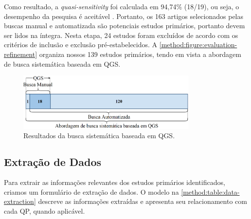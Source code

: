 Como resultado, a \textit{quasi-sensitivity} foi calculada em 94,74\% (18/19), ou seja, o desempenho da pesquisa é aceitável \cite{Zhang2011}. Portanto, os 163 artigos selecionados pelas buscas manual e automatizada são potenciais estudos primários, portanto devem ser lidos na íntegra. Nesta etapa, 24 estudos foram excluídos de acordo com os critérios de inclusão e exclusão pré-estabelecidos. A \autoref{method:figure:evaluation-refinement} organiza nossos 139 estudos primários, tendo em vista a abordagem de busca sistemática baseada em QGS.

\begin{figure}[htbp]
\caption{Resultados da busca sistemática baseada em QGS.}
\label{method:figure:evaluation-refinement}
\centerline{\includegraphics[width=0.8\textwidth]{images/systematic-mapping.png}}
\fautor
\end{figure}

\subsection{Extração de Dados}
\label{ms:conducao-extracao-dados}

Para extrair as informações relevantes dos estudos primários identificados, criamos um formulário de extração de dados. O modelo na \autoref{method:table:data-extraction} descreve as informações extraídas e apresenta seu relacionamento com cada QP, quando aplicável.

